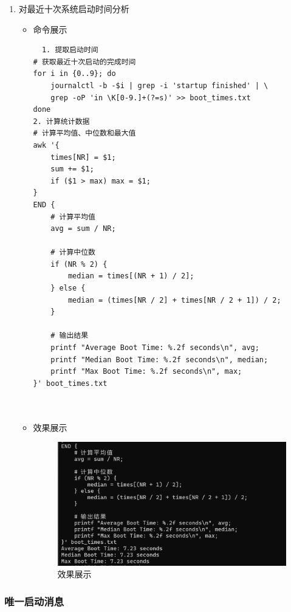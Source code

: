 \documentclass[UTF8]{ctexart}
\begin{document}
\begin{enumerate}
  \item 对最近十次系统启动时间分析
  \begin{itemize}
  \item 命令展示
  \begin{verbatim}
  1. 提取启动时间
# 获取最近十次启动的完成时间
for i in {0..9}; do
    journalctl -b -$i | grep -i 'startup finished' | \
    grep -oP 'in \K[0-9.]+(?=s)' >> boot_times.txt
done
2. 计算统计数据
# 计算平均值、中位数和最大值
awk '{
    times[NR] = $1;
    sum += $1;
    if ($1 > max) max = $1;
}
END {
    # 计算平均值
    avg = sum / NR;
    
    # 计算中位数
    if (NR % 2) {
        median = times[(NR + 1) / 2];
    } else {
        median = (times[NR / 2] + times[NR / 2 + 1]) / 2;
    }
    
    # 输出结果
    printf "Average Boot Time: %.2f seconds\n", avg;
    printf "Median Boot Time: %.2f seconds\n", median;
    printf "Max Boot Time: %.2f seconds\n", max;
}' boot_times.txt

    
  \end{verbatim}

  \item 效果展示
  \begin{figure}[H]
    \centering
    \includegraphics[width=\textwidth]{32} %
    \caption{效果展示}
  
  \end{figure}
\end{itemize}
\end{enumerate}

\subsubsection{唯一启动消息 }
\end{document}

